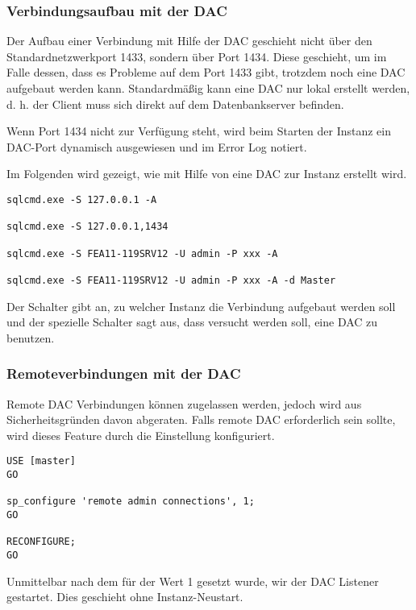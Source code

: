         \subsubsection{Verbindungsaufbau mit der DAC}
          Der Aufbau einer Verbindung mit Hilfe der DAC geschieht nicht über den
          Standardnetzwerkport 1433, sondern über Port 1434. Diese geschieht, um
          im Falle dessen, dass es Probleme auf dem Port 1433 gibt, trotzdem
          noch eine DAC aufgebaut werden kann. Standardmäßig kann eine DAC nur
          lokal erstellt werden, d. h. der Client muss sich direkt auf dem
          Datenbankserver befinden. 
          \begin{merke}
            Wenn Port 1434 nicht zur Verfügung steht, wird beim Starten der
            Instanz ein DAC-Port dynamisch ausgewiesen und im Error Log notiert.
          \end{merke}
          Im Folgenden wird gezeigt, wie mit Hilfe von 
          eine DAC zur Instanz erstellt wird.
          \begin{lstlisting}[language=terminal, caption={SQLCMD.exe mit DAC
          benutzen}, label=admin19_10]
sqlcmd.exe -S 127.0.0.1 -A

sqlcmd.exe -S 127.0.0.1,1434

sqlcmd.exe -S FEA11-119SRV12 -U admin -P xxx -A

sqlcmd.exe -S FEA11-119SRV12 -U admin -P xxx -A -d Master
        \end{lstlisting}
        Der Schalter  gibt an, zu welcher Instanz die Verbindung
        aufgebaut werden soll und der spezielle Schalter  sagt
        aus, dass versucht werden soll, eine DAC zu benutzen.
        \subsubsection{Remoteverbindungen mit der DAC}
          Remote DAC Verbindungen können zugelassen werden, jedoch wird aus
          Sicherheitsgründen davon abgeraten. Falls remote DAC erforderlich sein
          sollte, wird dieses Feature durch die Einstellung
           konfiguriert.          
           \begin{lstlisting}[language=ms_sql, caption={Konfigurieren
          von Remote DAC Verbindungen}, label=admin19_11]
USE [master]
GO

sp_configure 'remote admin connections', 1;
GO

RECONFIGURE;
GO
        \end{lstlisting}
        Unmittelbar nach dem für  der
        Wert 1 gesetzt wurde, wir der DAC Listener gestartet. Dies
        geschieht ohne Instanz-Neustart.
        
